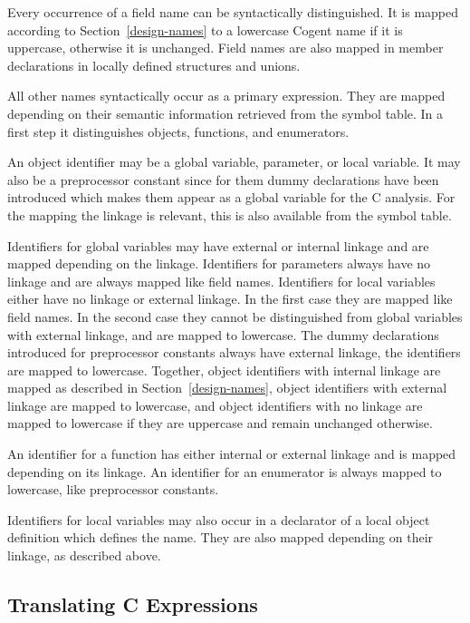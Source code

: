 Every occurrence of a field name can be syntactically distinguished. It is mapped according to 
Section~\ref{design-names} to a lowercase Cogent name if it is uppercase, otherwise it is unchanged.
Field names are also mapped in member declarations in locally defined structures and unions.

All other names syntactically occur as a primary expression. They are mapped depending on their semantic
information retrieved from the symbol table. In a first step it distinguishes objects, functions, 
and enumerators.

An object identifier may be a global variable, parameter, or local variable. It may also be a preprocessor 
constant since for them dummy declarations have been introduced which makes them appear as a global variable
for the C analysis. For the mapping the linkage is relevant, this is also available from the symbol table.

Identifiers for global variables may have external or internal linkage and are mapped depending on the
linkage. Identifiers for parameters always have no linkage and are always mapped like field names. Identifiers
for local variables either have no linkage or external linkage. In the first case they are mapped like
field names. In the second case they cannot be distinguished from global variables with external linkage,
and are mapped to lowercase. The dummy declarations introduced for preprocessor constants
always have external linkage, the identifiers are mapped to lowercase. Together, object identifiers with 
internal linkage are mapped as described in Section~\ref{design-names}, object identifiers with external
linkage are mapped to lowercase, and object identifiers with no linkage are mapped to lowercase if they are
uppercase and remain unchanged otherwise.

An identifier for a function has either internal or external linkage and is mapped depending on its linkage.
An identifier for an enumerator is always mapped to lowercase, like preprocessor constants.

Identifiers for local variables may also occur in a declarator of a local object definition which defines 
the name. They are also mapped depending on their linkage, as described above.

\subsection{Translating C Expressions}
\label{impl-ccode-cexpr}

